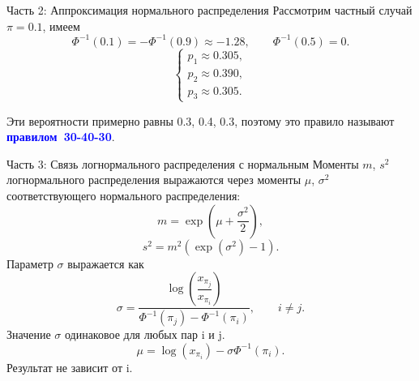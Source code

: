 \documentclass[ucs, notheorems, handout]{beamer}
\begin{document}
\begin{frame}{Часть 2: Аппроксимация нормального распределения}
	Рассмотрим частный случай $\pi = 0.1$, имеем 
	$$\Phi ^{-1}(0.1) = -\Phi ^{-1}(0.9) \approx  -1.28, \qquad \Phi ^{-1}(0.5) = 0. $$
	\begin{equation*}
		\begin{cases}
			p_{1}\approx 0.305, \\ 
			p_{2}\approx 0.390,  \\ 
			p_{3}\approx 0.305.
		\end{cases}
	\end{equation*}
	
	Эти вероятности примерно равны 0.3, 0.4, 0.3, поэтому это правило называют \textcolor{blue}{\hbox{\textbf{правилом 30-40-30}}}.
	
\end{frame}	

\begin{frame}{Часть 3: Связь логнормального распределения с нормальным}
	Моменты $m$, $s^{2}$ логнормального распределения выражаются через моменты $\mu$, $\sigma ^{2}$ соответствующего нормального распределения:
	\begin{equation*}
		m = \exp\left( \mu+\frac{\sigma ^{2}}{2}\right) ,
	\end{equation*} \label{10}
	\begin{equation*}
		s^{2} = m^{2}(\exp(\sigma^{2})-1).
	\end{equation*} \label{11}
	Параметр $\sigma$ выражается как
	\begin{equation*}
		\displaystyle{\sigma = \dfrac{\log\left(\dfrac{x_{\pi_{j}}}{x_{\pi_{i}}}\right)}{\Phi ^{-1}(\pi_{j}) - \Phi ^{-1}(\pi_{i})}}, \quad \quad i\neq j.
	\end{equation*} \label{13}
	Значение $\sigma$ одинаковое для любых пар i и j.
	\begin{equation*}
		\mu = \log(x_{\pi_{i}}) - \sigma\Phi ^{-1}(\pi_{i}).
	\end{equation*}
	Результат не зависит от i.
\end{frame}
\end{document}

